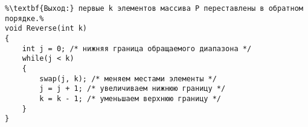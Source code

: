 \documentclass{article}
\begin{document}
\begin{lstlisting}[escapechar=\%]
%\noindent\textbf{Вход:} k - номер элемента, задающий отрезок массива P, подлежащий перестановке в обратном порядке.%
%\textbf{Выход:} первые k элементов массива P переставлены в обратном порядке.%
void Reverse(int k)
{
	int j = 0; /* нижняя граница обращаемого диапазона */
	while(j < k)
	{
		swap(j, k); /* меняем местами элементы */
		j = j + 1; /* увеличиваем нижнюю границу */
		k = k - 1; /* уменьшаем верхнюю границу */
	}
}
\end{lstlisting}
\end{document}
